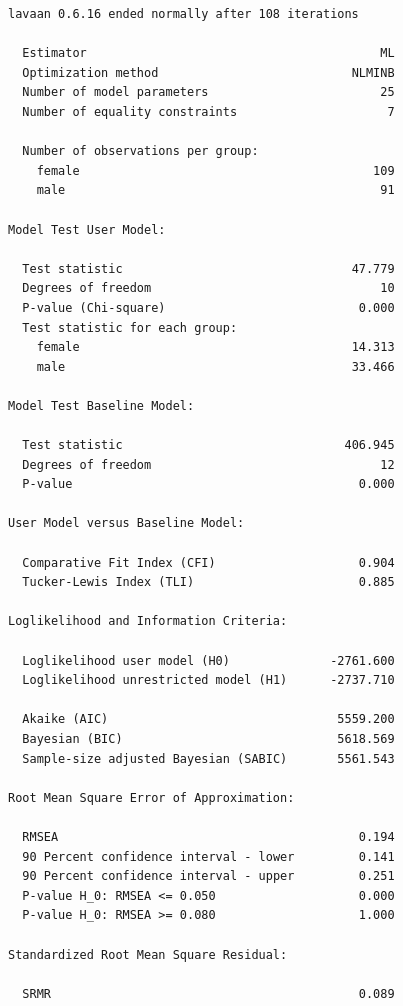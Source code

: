 \documentclass[
  letterpaper,
  DIV=11,
  numbers=noendperiod]{scrreprt}
\begin{document}
\begin{verbatim}
lavaan 0.6.16 ended normally after 108 iterations

  Estimator                                         ML
  Optimization method                           NLMINB
  Number of model parameters                        25
  Number of equality constraints                     7

  Number of observations per group:                   
    female                                         109
    male                                            91

Model Test User Model:
                                                      
  Test statistic                                47.779
  Degrees of freedom                                10
  P-value (Chi-square)                           0.000
  Test statistic for each group:
    female                                      14.313
    male                                        33.466

Model Test Baseline Model:

  Test statistic                               406.945
  Degrees of freedom                                12
  P-value                                        0.000

User Model versus Baseline Model:

  Comparative Fit Index (CFI)                    0.904
  Tucker-Lewis Index (TLI)                       0.885

Loglikelihood and Information Criteria:

  Loglikelihood user model (H0)              -2761.600
  Loglikelihood unrestricted model (H1)      -2737.710
                                                      
  Akaike (AIC)                                5559.200
  Bayesian (BIC)                              5618.569
  Sample-size adjusted Bayesian (SABIC)       5561.543

Root Mean Square Error of Approximation:

  RMSEA                                          0.194
  90 Percent confidence interval - lower         0.141
  90 Percent confidence interval - upper         0.251
  P-value H_0: RMSEA <= 0.050                    0.000
  P-value H_0: RMSEA >= 0.080                    1.000

Standardized Root Mean Square Residual:

  SRMR                                           0.089


\end{verbatim}
\end{document}
